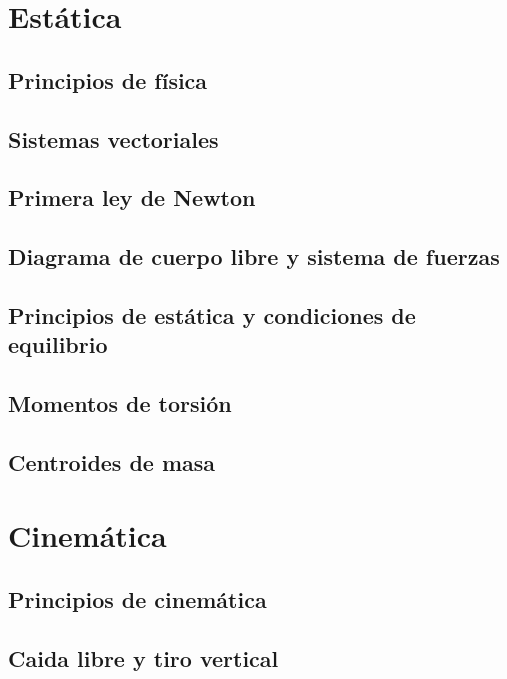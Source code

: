 \documentclass{../Resume}
\begin{document}
\Portada
\Indice
\fancystyle
\onehalfspacing


\part{Estática}

    \chapter{Principios de física}
        
        
    \chapter{Sistemas vectoriales}
        
        
    \chapter{Primera ley de Newton}
    \chapter{Diagrama de cuerpo libre y sistema de fuerzas}
    \chapter{Principios de estática y condiciones de equilibrio}
    \chapter{Momentos de torsión}
    \chapter{Centroides de masa}

\part{Cinemática}

    \chapter{Principios de cinemática}
    \chapter{Caida libre y tiro vertical}
\end{document}

